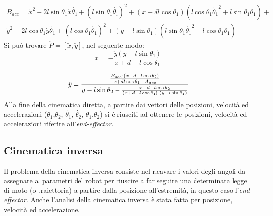 \begin{equation*}
    \begin{aligned}
    B_{acc} = \dot{x}^2+2l\sin\theta_1\dot{x}\dot{\theta_1} + (l\sin\theta_1\dot{\theta_1})^2+(x+dl\cos\theta_1)(l\cos\theta_1\dot{\theta_1}^2+l\sin\theta_1\ddot{\theta_1})+
    \\ \dot{y}^2 -2l\cos\theta_1 \dot{y}\dot{\theta_1}+(l\cos\theta_1\dot{\theta_1})^2+(y-l\sin\theta_1)(l\sin\theta_1\dot{\theta_1}^2-l\cos\theta_1\ddot{\theta_1})
    \end{aligned}
\end{equation*}
Si può trovare $\ddot{P} = [\ddot{x},\ddot{y}]$, nel seguente modo:
\begin{equation}
	\ddot{x} = - \frac{\ddot{y}(y-l\sin\theta_1)}{x+d-l\cos\theta_1}
\end{equation}

\begin{equation}
	\large
     \ddot{y} = \frac{\frac{B_{acc}\cdot(x-d-l\cos\theta_2)}{x+dl\cos\theta_1-A_{acc}}}{y-l\sin\theta_2-\frac{x-d-l\cos\theta_2}{(x+d-l\cos\theta_1)\cdot(y-l\sin\theta_1)}}
\end{equation}
Alla fine della cinematica diretta, a partire dai vettori delle posizioni, velocità ed accelerazioni ($\theta_1$,$\theta_2$, $\dot{\theta_1}$, $\dot{\theta_2}$, $\ddot{\theta_1}$,$\ddot{\theta_2}$) si è riusciti ad ottenere le posizioni, velocità ed accelerazioni riferite all'\textit{end-effector}.
\subsection{Cinematica inversa}
Il problema della cinematica inversa consiste nel ricavare i valori degli angoli da assegnare ai parametri del robot per riuscire a far seguire una determinata legge di moto (o traiettoria) a partire dalla posizione all'estremità, in questo caso l'\textit{end-effector}. Anche l'analisi della cinematica inversa è stata fatta per posizione, velocità ed accelerazione.

